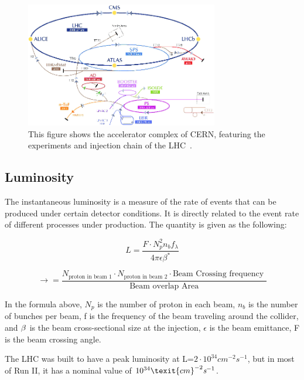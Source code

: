 \begin{figure}[!htb]
    \begin{center}
        \includegraphics[width=0.75\textwidth]{figures/chapter_ATLAS/LHCAcceleratorComplex}
        \caption{
			This figure shows the accelerator complex of CERN, featuring the experiments and injection chain of the LHC~\cite{Marcastel:1621583}.
        }
        \label{fig:CERNAcceleratorComplex}
    \end{center}
\end{figure}

\subsection{Luminosity}
The instantaneous luminosity is a measure of the rate of events that can be produced under certain detector conditions. It is directly related to the event rate of different processes under production.   
The quantity is given as the following:

\begin{equation}
    L = \frac{F \cdot N^{2}_{p} n_{b} f_{\lambda}}{4\pi\epsilon \beta^{*}}
\end{equation}


\begin{equation}
    \rightarrow = \frac{N_{\textrm{proton in beam 1}} \cdot N_{\textrm{proton in beam 2}} \cdot \textrm{Beam Crossing frequency }}{\textrm{Beam overlap Area}}
\end{equation}

In the formula above, $N_p$ is the number of proton in each beam, $n_{b}$ is the number of bunches per beam, f is the frequency of the beam traveling around the collider, and $\beta^{\*}$ is the beam cross-sectional size at the injection, $\epsilon$ is the beam emittance, F is the beam crossing angle.

The LHC was built to have a peak luminosity at L=$2 \cdot 10^{34}cm^{-2}s^{-1}$, but in most of Run II, it has a nominal value of $10^{34}\texit{cm}^{-2}\textit{s}^{-1}$.

